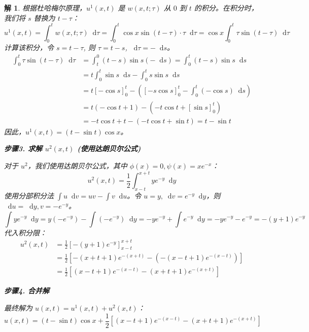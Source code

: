 \documentclass[12pt,a4paper]{article}
\newcommand{\diff}{\mathop{}\!\mathrm{d}}  %
\newtheorem*{solution}{解}
\begin{document}
\begin{solution}
	\noindent
	根据杜哈梅尔原理，$u^1(x,t)$ 是 $w(x,t;\tau)$ 从 $0$ 到 $t$ 的积分。在积分时，我们将 $s$ 替换为 $t-\tau$：
	\[
	u^1(x,t) = \int_0^t w(x,t;\tau) \diff \tau = \int_0^t \cos x \sin(t-\tau) \cdot \tau \diff \tau = \cos x \int_0^t \tau \sin(t-\tau) \diff \tau
	\]
	计算该积分，令 $s = t-\tau$, 则 $\tau = t-s$, $\diff \tau = -\diff s$。
	\begin{align*}
		\int_0^t \tau \sin(t-\tau) \diff \tau &= \int_t^0 (t-s)\sin s (-\diff s) = \int_0^t (t-s)\sin s \diff s \\
		&= t \int_0^t \sin s \diff s - \int_0^t s\sin s \diff s \\
		&= t [-\cos s]_0^t - \left( [-s\cos s]_0^t - \int_0^t (-\cos s) \diff s \right) \\
		&= t(-\cos t + 1) - \left( -t\cos t + [\sin s]_0^t \right) \\
		&= -t\cos t + t - (-t\cos t + \sin t) = t - \sin t
	\end{align*}
	因此，$u^1(x,t) = (t-\sin t)\cos x$。
	
	\hrulefill
	
	\textbf{步骤3. 求解 $u^2(x,t)$ (使用达朗贝尔公式)}
	
	\noindent
	对于 $u^2$，我们使用达朗贝尔公式，其中 $\phi(x)=0, \psi(x)=xe^{-x}$：
	\[
	u^2(x,t) = \frac{1}{2} \int_{x-t}^{x+t} y e^{-y} \diff y
	\]
	使用分部积分法 $\int u \diff v = uv - \int v \diff u$。令 $u=y, \diff v = e^{-y}\diff y$，则 $\diff u = \diff y, v = -e^{-y}$。
	\[
	\int y e^{-y} \diff y = y(-e^{-y}) - \int (-e^{-y}) \diff y = -y e^{-y} + \int e^{-y} \diff y = -y e^{-y} - e^{-y} = -(y+1)e^{-y}
	\]
	代入积分限：
	\begin{align*}
		u^2(x,t) &= \frac{1}{2} \left[ -(y+1)e^{-y} \right]_{x-t}^{x+t} \\
		&= \frac{1}{2} \left[ -(x+t+1)e^{-(x+t)} - (-(x-t+1)e^{-(x-t)}) \right] \\
		&= \frac{1}{2} \left[ (x-t+1)e^{-(x-t)} - (x+t+1)e^{-(x+t)} \right]
	\end{align*}
	
	\hrulefill
	
	\textbf{步骤4. 合并解}
	
	\noindent
	最终解为 $u(x,t) = u^1(x,t) + u^2(x,t)$：
	\[
	u(x,t) = (t-\sin t)\cos x + \frac{1}{2} \left[ (x-t+1)e^{-(x-t)} - (x+t+1)e^{-(x+t)} \right]
	\]
\end{solution}
	
	\newpage
\end{document}
